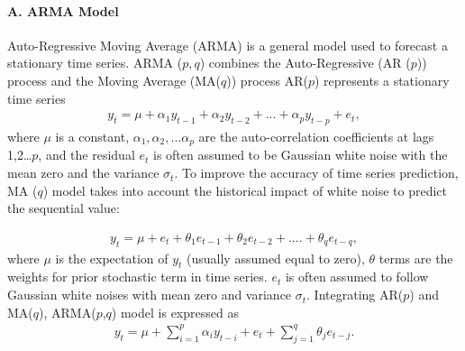 \paragraph{A. ARMA Model}
\vspace{-0.05in}
Auto-Regressive Moving Average (ARMA)\cite{brockwell2002introduction} is a general model used to forecast a stationary time series. ARMA ($p,q$) combines the Auto-Regressive (AR ($p$)) process and the Moving Average (MA($q$)) process AR($p$) represents a stationary time series
\begin{eqnarray}
				y_t = \mu + \alpha_1{y_{t-1}}+\alpha_2{y_{t-2}}+...+\alpha_p{y_{t-p}}+e_t,
\end{eqnarray}
where $\mu$ is a constant, $\alpha_1,\alpha_2,...\alpha_p$ are the auto-correlation coefficients at lags 1,2…$p$, and the residual $e_t$ is often assumed to be Gaussian white noise with the mean zero and the variance $\sigma_t$.  To improve the accuracy of time series prediction,  MA ($q$) model takes into account  the historical impact of white noise to predict the sequential value: %


\begin{eqnarray}
	y_t = \mu + e_t+\theta_1{e_{t-1}}+\theta_2{e_{t-2}}+....+\theta_q{e_{t-q}},
\end{eqnarray}
where $\mu$ is the expectation of $y_t$ (usually assumed equal to zero), $\theta$ terms are the weights for prior stochastic term in time series. $e_t$ is often assumed to follow Gaussian white noises with mean zero and variance $\sigma_t$. 
Integrating AR($p$) and MA($q$), ARMA($p$,$q$) model is expressed as
\begin{eqnarray}
   y_t = \mu + \sum_{i=1}^{p} {\alpha_i{y_{t-i}}} + e_t+ \sum_{j=1}^{q} {\theta_j{e_{t-j}}}.
\end{eqnarray}

